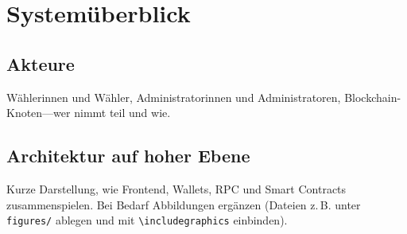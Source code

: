 \chapter{Systemüberblick}

\section{Akteure}
Wählerinnen und Wähler, Administratorinnen und Administratoren,
Blockchain-Knoten—wer nimmt teil und wie.

\section{Architektur auf hoher Ebene}
Kurze Darstellung, wie Frontend, Wallets, RPC und Smart Contracts
zusammenspielen. Bei Bedarf Abbildungen ergänzen (Dateien z.\,B. unter
\texttt{figures/} ablegen und mit \verb|\includegraphics| einbinden).
